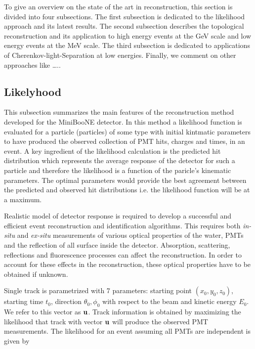 To give an overview on the state of the art in reconstruction, this section is divided into four subsections. The first
subsection is dedicated to the likelihood approach and its latest results. The second subsection describes the topological 
reconstruction and its application to high energy events at the GeV scale and low energy events at the MeV scale. The third 
subsection is dedicated to applications of Cherenkov-light-Separation at low energies. Finally,  we comment 
on other approaches like …..

\subsection{Likelyhood}

This subsection summarizes the main features of the reconstruction 
method developed for the MiniBooNE detector\cite{ryanpaper}. In this 
method a likelihood function is evaluated for a particle (particles) of some type
with initial kintmatic parameters to have produced the observed collection 
of PMT hits, charges and times, in an event. A key ingredient 
of the likelihood calculation is the predicted hit distribution which 
represents the average response of the detector for such a particle and
therefore the likelihood is a function of the paricle's kinematic parameters. 
The optimal parameters would provide the best agreement between
the predicted and observed hit distributions i.e. the likelihood
function will be at a maximum.

Realistic model of detector response is required to develop a
successful and efficient event reconstruction and identification algorithms.
This requires both {\it in-situ} and {\it ex-situ} measurements
of various optical properties of the water, PMTs and the reflection
of all surface inside the detector. Absorption, scattering, reflections
and fluorescence processes can affect the reconstruction.
In order to account for these effects in the reconstruction,
these optical properties have to be obtained if unknown. 

Single track is parametrized with 7 parameters: starting point $(x_0, y_0, z_0)$,
starting time $t_0$, direction $\theta_0, \phi_0$ with respect to the beam
and kinetic energy $E_0$. We refer to this vector as ${\bf u}$.
Track information is obtained by maximizing the likelihood that
track with vector ${\bf u}$ will produce the observed PMT
measurements. The likelihood for an event assuming all PMTs are independent
is given by

